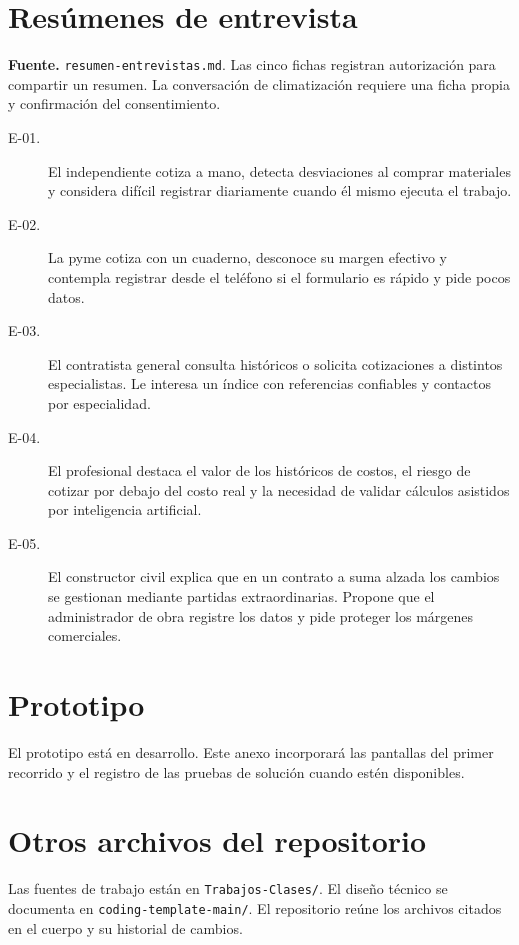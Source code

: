 \documentclass[11pt]{article}
\begin{document}
\section{Resúmenes de entrevista}
\textbf{Fuente.} \texttt{resumen-entrevistas.md}. Las cinco fichas
registran autorización para compartir un resumen. La conversación de
climatización requiere una ficha propia y confirmación del consentimiento.

\begin{description}
  \item[E-01.] El independiente cotiza a mano, detecta desviaciones al
  comprar materiales y considera difícil registrar diariamente cuando
  él mismo ejecuta el trabajo.
  \item[E-02.] La pyme cotiza con un cuaderno, desconoce su margen
  efectivo y contempla registrar desde el teléfono si el formulario
  es rápido y pide pocos datos.
  \item[E-03.] El contratista general consulta históricos o solicita
  cotizaciones a distintos especialistas. Le interesa un índice con
  referencias confiables y contactos por especialidad.
  \item[E-04.] El profesional destaca el valor de los históricos de
  costos, el riesgo de cotizar por debajo del costo real y la necesidad
  de validar cálculos asistidos por inteligencia artificial.
  \item[E-05.] El constructor civil explica que en un contrato a suma
  alzada los cambios se gestionan mediante partidas extraordinarias.
  Propone que el administrador de obra registre los datos y pide
  proteger los márgenes comerciales.
\end{description}

\section{Prototipo}
El prototipo está en desarrollo. Este anexo incorporará las pantallas
del primer recorrido y el registro de las pruebas de solución
cuando estén disponibles.

\section{Otros archivos del repositorio}
Las fuentes de trabajo están en \texttt{Trabajos-Clases/}. El
diseño técnico se documenta en \texttt{coding-template-main/}.
El repositorio reúne los archivos citados en el cuerpo y su historial
de cambios.
\end{document}
